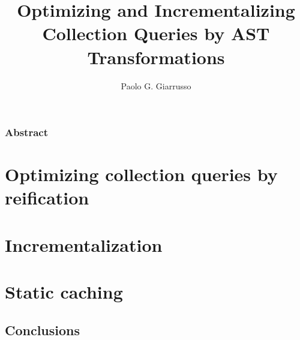 \documentclass{book}
\title{Optimizing and Incrementalizing Collection Queries by AST Transformations}
\author{Paolo G. Giarrusso}
\begin{document}
\maketitle


\section*{Abstract}

\tableofcontents

\listoffigures
\listoftables



\part{Optimizing collection queries by reification}
\label{part:ch-aosd13}





\part{Incrementalization}
\label{part:incr}






%
%

%

%



% 
% 

\begin{oldSec}

\end{oldSec}

\begin{oldSec}

\end{oldSec}

\part{Static caching}
\label{part:static}



\chapter{Conclusions}



\end{document}
